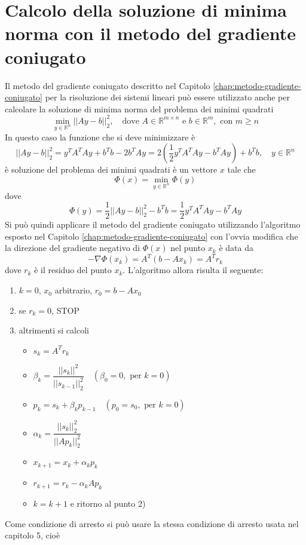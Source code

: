 \section{Calcolo della soluzione di minima norma con il
metodo del gradiente coniugato}
Il metodo del gradiente coniugato descritto nel Capitolo \ref{chap:metodo-gradiente-coniugato}
 per la risoluzione dei sistemi lineari pu\`o essere utilizzato 
anche per calcolare la soluzione 
di minima norma del problema dei minimi quadrati
$$
\displaystyle \min_{y \in \mathbb{R}^{n}}
||Ay - b||_2^{2}, \quad \text{dove } A \in
\mathbb{R}^{m \times n} \text{ e } b \in \mathbb{R}^{m}, \text{ con }
m \geq n 
$$
In questo caso la funzione che si deve minimizzare \`e
$$
||Ay - b||_2^{2} = y^T A^T Ay + b^Tb -2b^TAy = 2(\frac{1}{2}
y^{T}A^{T}A y - b^TAy) + b^Tb, \quad y \in \mathbb{R}^n 
$$
\`e soluzione del problema dei minimi quadrati \`e un vettore $x$ tale che
$$
\Phi(x) = \min_{y \in \mathbb{R}^{n}} \Phi(y)
$$
dove
$$
\Phi(y) = \frac{1}{2}||Ay-b||_2^2 - b^Tb = 
\frac{1}{2}y^TA^TAy - b^TAy
$$
Si pu\`o quindi applicare il metodo del gradiente coniugato
 utilizzando l'algoritmo esposto nel Capitolo \ref{chap:metodo-gradiente-coniugato} con
 l'ovvia modifica che la direzione del gradiente negativo di
$\Phi(x)$   nel punto $x_k$ \`e  data da
$$
-\nabla \Phi(x_k) = A^T(b-Ax_k)=A^Tr_k
$$
dove $r_k$ \`e il residuo del punto $x_k$. L'algoritmo allora risulta
il seguente:
\begin{enumerate}
\item $k=0$, $x_0$ arbitrario, $r_0 = b - Ax_0$
\item se $r_k=0$, STOP
\item altrimenti si calcoli
  \begin{itemize}
  \item $s_k = A^Tr_k$
  \item $\beta_k = \dfrac{||s_k||^2}{||s_{k-1}||_2^2} \quad
(\beta_0 = 0, \text{ per } k=0)$
\item $p_k = s_k + \beta_k p_{k-1} \quad (p_0 = s_0, \text{ per } k=0)$
\item $\alpha_k = \dfrac{||s_k||_2^2}{||Ap_k||_2^2} $
 \item $x_{k+1} = x_k + \alpha_k p_k$
\item $r_{k+1} = r_k - \alpha_k Ap_k$
\item $k = k+1$ e ritorno al punto 2)
  \end{itemize}
\end{enumerate}

Come condizione di arresto si pu\`o usare la stessa condizione di
 arresto usata nel capitolo 5, cio\`e


